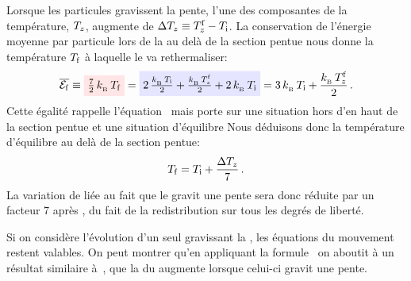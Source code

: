 Lorsque les particules gravissent la pente, l'une des composantes de la température, $T_{z}$, augmente de $\Delta T_{z} \equiv T_{z}^{\rm f} - T_{\rm i}$. La conservation de l'énergie \thiq moyenne par particule lors de la \reth au delà de la section pentue nous donne la température $T_{\rm f}$ à laquelle le \jat va rethermaliser:
\begin{equation}
\Moyenne{\Eatfin} \equiv 
	\ArriveeHiglightColorMath{red}{\frac{7}{2}\,\kb\,\Teqfin}
	= \ArriveeHiglightColorMath{blue}{2\,\frac{\kb\,\Teqini}{2}	+ \frac{\kb\,\Tlongfin}{2} + 2\,\kb\,\Teqini}
	= 3\,\kb\,\Teqini + \frac{\kb\,\Tlongfin}{2}
\pointformule
	\label{eq:PenteRetherm}
\end{equation}
Cette égalité rappelle l'équation~ mais porte sur une situation hors d'\eqthdy en haut de la section pentue  et une situation d'équilibre 
 Nous déduisons donc la température d'équilibre au delà de la section pentue:
\begin{equation}
	\Teqfin = \Teqini + \frac{\Delta \Tlong}{7}
	\label{eq:PenteRethermTeq}
\pointformule
\end{equation}
La variation de \templong liée au fait que le \jat gravit une pente sera donc réduite par un facteur $7$ après \reth, du fait de la redistribution sur tous les degrés de liberté.

{\label{Rq:RalentirPaquetPente}
Si on considère l'évolution d'un seul \pat gravissant la \secpent, les équations du mouvement~ restent valables. On peut montrer qu'en appliquant la formule~ on aboutit à un résultat similaire à~, \cad que la \dispvitlong du \pat augmente lorsque celui-ci gravit une pente.
}
